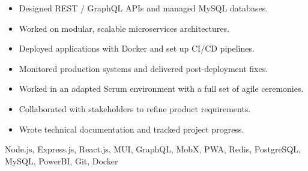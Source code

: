 \begin{experiences}
{\begin{itemize}
                \item Designed REST / GraphQL APIs and managed MySQL databases.
                \item Worked on modular, scalable microservices architectures.
                \item Deployed applications with Docker and set up CI/CD pipelines.
                \item Monitored production systems and delivered post-deployment fixes.
                \item Worked in an adapted Scrum environment with a full set of agile ceremonies.
                \item Collaborated with stakeholders to refine product requirements.
                \item Wrote technical documentation and tracked project progress.\\
            \end{itemize}}
            {Node.js, Express.js, React.js, MUI, GraphQL, MobX, PWA, Redis, PostgreSQL, MySQL, PowerBI, Git, Docker}
    \emptySeparator
\end{experiences}
